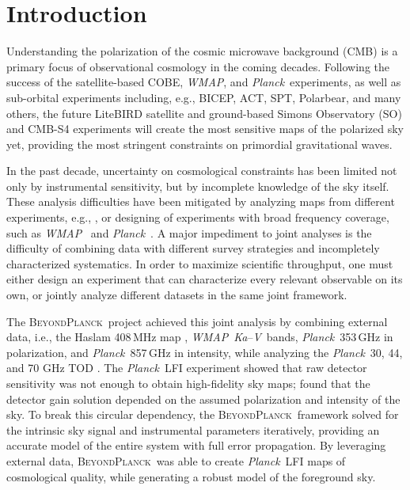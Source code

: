 \documentclass[twocolumn]{../../common/aa}
\def\WMAP{\emph{WMAP}}
\def\Planck{\emph{Planck}}
\newcommand{\bp}{\textsc{BeyondPlanck}}
\newcommand{\Ka}[0]{\textit{Ka}}
\newcommand{\V}[0]{\textit V}
\begin{document}
\maketitle

\tableofcontents




\section{Introduction}
\label{sec:introduction}

Understanding the polarization of the cosmic microwave background (CMB) is a primary focus of observational cosmology in the coming decades. Following the success of the satellite-based COBE, \WMAP, and \Planck\ experiments, as well as sub-orbital experiments including, e.g., BICEP, ACT, SPT, Polarbear, and many others, the future LiteBIRD satellite and ground-based Simons Observatory (SO) and CMB-S4 experiments will create the most sensitive maps of the polarized sky yet, providing the most stringent constraints on primordial gravitational waves.

In the past decade, uncertainty on cosmological constraints has been limited not only by instrumental sensitivity, but by incomplete knowledge of the sky itself. These analysis difficulties have been mitigated by analyzing maps from different experiments, e.g., \citet{pb2015}, or designing of experiments with broad frequency coverage, such as \WMAP\ \citep{bennett2012} and \Planck\ \citep{planck2016-l01}. A major impediment to joint analyses is the difficulty of combining data with different survey strategies and incompletely characterized systematics. In order to maximize scientific throughput, one must either design an experiment that can characterize every relevant observable on its own, or jointly analyze different datasets in the same joint framework.

The \bp\ project achieved this joint analysis by combining external data, i.e., the Haslam 408\,MHz map \citep{haslam1982}, \WMAP\ \Ka--\V\ bands, \Planck\ 353\,GHz in polarization, and \Planck\ 857\,GHz in intensity, while analyzing the \Planck\ 30, 44, and 70 GHz TOD \citep{bp01}.
The \Planck\ LFI experiment showed that raw detector sensitivity was not enough to obtain high-fidelity sky maps; \citet{planck2016-l02} found that the detector gain solution depended on the assumed polarization and intensity of the sky. To break this circular dependency, the \bp\ framework solved for the intrinsic sky signal and instrumental parameters iteratively, providing an accurate model of the entire system with full error propagation. By leveraging external data, \bp\ was able to create \Planck\ LFI maps of cosmological quality, while generating a robust model of the foreground sky.
\end{document}

